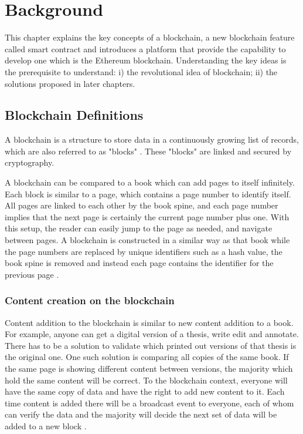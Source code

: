 \documentclass[twoside,numperchapter]{tutthesis} %
\begin{document}
\chapter{Background}
\label{ch:background}

This chapter explains the key concepts of a blockchain, a new blockchain feature called smart contract and introduces a platform that provide the capability to develop one which is the Ethereum blockchain. Understanding the key ideas is the prerequisite to understand: i) the revolutional idea of blockchain; ii) the solutions proposed in later chapters.

\section{Blockchain Definitions}

A blockchain is a structure to store data in a continuously growing list of records, which are also referred to as "blocks" \citep{RefWorks:doc:WhatIsBlockChain}. These "blocks" are linked and secured by cryptography.

A blockchain can be compared to a book which can add pages to itself infinitely. Each block is similar to a page, which contains a page number to identify itself. All pages are linked to each other by the book spine, and each page number implies that the next page is certainly the current page number plus one. With this setup, the reader can easily jump to the page as needed, and navigate between pages. A blockchain is constructed in a similar way as that book while the page numbers are replaced by unique identifiers such as a hash value, the book spine is removed and instead each page contains the identifier for the previous page \citep{RefWorks:doc:BlockchainBasicsBook}.

\subsection{Content creation on the blockchain}
\label{contentCreationOnBlockchain}

Content addition to the blockchain is similar to new content addition to a book. For example, anyone can get a digital version of a thesis, write edit and annotate. There has to be a solution to validate which printed out versions of that thesis is the original one. One such solution is comparing all copies of the same book. If the same page is showing different content between versions, the majority which hold the same content will be correct. To the blockchain context, everyone will have the same copy of data and have the right to add new content to it. Each time content is added there will be a broadcast event to everyone, each of whom can verify the data and the majority will decide the next set of data will be added to a new block \citep{RefWorks:doc:BitcoinWhitepaper}.
\end{document}
